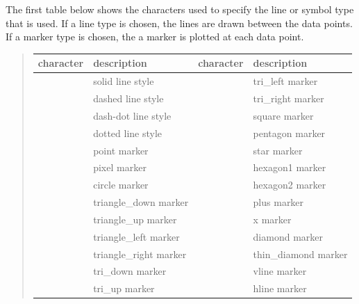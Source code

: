 \documentclass[letterpaper,10pt,english]{sphinxmanual}
\begin{document}
The first table below shows the characters used to specify the line or symbol type that is used.  If a line type is chosen, the lines are drawn between the data points.  If a marker type is chosen, the a marker is plotted at each data point.
\begin{quote}

\begin{tabulary}{\linewidth}{|L|L|L|L|}
\hline
\textsf{\relax 
character
} & \textsf{\relax 
description
} & \textsf{\relax 
character
} & \textsf{\relax 
description
}\\
\hline
\code{-}
 & 
solid line style
 & 
 & 
tri\_left marker
\\

\code{-{-}}
 & 
dashed line style
 & 
 & 
tri\_right marker
\\

 & 
dash-dot line style
 & 
 & 
square marker
\\

\code{:}
 & 
dotted line style
 & 
 & 
pentagon marker
\\

 & 
point marker
 & 
\code{*}
 & 
star marker
\\

\code{,}
 & 
pixel marker
 & 
 & 
hexagon1 marker
\\

 & 
circle marker
 & 
 & 
hexagon2 marker
\\

 & 
triangle\_down marker
 & 
\code{+}
 & 
plus marker
\\

\code{\textasciicircum{}}
 & 
triangle\_up marker
 & 
 & 
x marker
\\

\code{\textless{}}
 & 
triangle\_left marker
 & 
 & 
diamond marker
\\

\code{\textgreater{}}
 & 
triangle\_right marker
 & 
 & 
thin\_diamond marker
\\

 & 
tri\_down marker
 & 
\code{\textbar{}}
 & 
vline marker
\\

 & 
tri\_up marker
 & 
\code{\_}
 & 
hline marker
\\
\hline\end{tabulary}

\end{quote}
\end{document}

